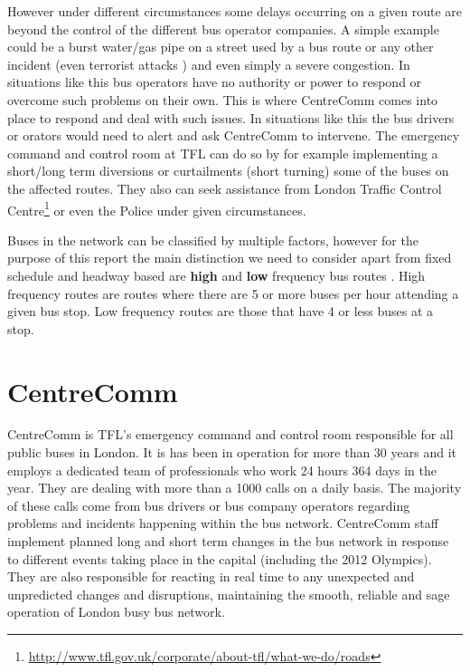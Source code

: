 However under different circumstances some delays occurring on a given route are beyond the control of the different bus operator companies. A simple example could be a burst water/gas pipe on a street used by a bus route or any other incident (even terrorist attacks \cite{centreComm}) and even simply a severe congestion. In situations like this bus operators have no authority or power to respond or overcome such problems on their own. This is where CentreComm comes into place to respond and deal with such issues. In situations like this the bus drivers or orators would need to alert and ask CentreComm to intervene. The emergency command and control room at TFL can do so by for example implementing a short/long term diversions or curtailments (short turning) some of the buses on the affected routes. They also can seek assistance from London Traffic Control Centre\footnote{\url{http://www.tfl.gov.uk/corporate/about-tfl/what-we-do/roads}} or even the Police under given circumstances.

Buses in the network can be classified by multiple factors, however for the purpose of this report the main distinction we need to consider apart from fixed schedule and headway based are \textbf{high} and \textbf{low} frequency bus routes \cite{busTendering}. High frequency routes are routes where there are 5 or more buses per hour attending a given bus stop. Low frequency routes are those that have 4 or less buses at a stop.

\section{CentreComm}
CentreComm is TFL's emergency command and control room responsible for all public buses in London. It is has been in operation for more than 30 years \cite{centreComm} and it employs a dedicated team of professionals who work 24 hours 364 days in the year. They are dealing with more than a 1000 calls on a daily basis. The majority of these calls come from bus drivers or bus company operators regarding problems and incidents happening within the bus network. CentreComm staff implement planned long and short term changes in the bus network in response to different events taking place in the capital (including the 2012 Olympics). They are also responsible for reacting in real time to any unexpected and unpredicted changes and disruptions, maintaining the smooth, reliable and sage operation of London busy bus network.


